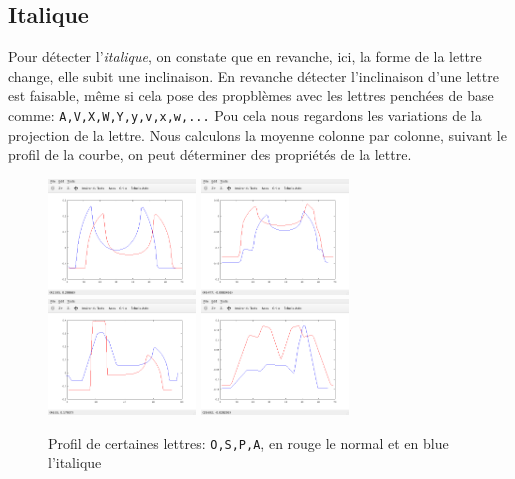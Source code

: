 \documentclass[a4paper,12pt,titlepage]{report}
\begin{document}
	\subsection{Italique}
	Pour détecter l'\textit{italique}, on constate que en revanche, ici, la forme de la lettre change, elle subit une inclinaison.
	En revanche détecter l'inclinaison d'une lettre est faisable, même si cela pose des propblèmes avec les lettres penchées de base comme: \texttt{A,V,X,W,Y,y,v,x,w,...}
	Pou cela nous regardons les variations de la projection de la lettre. Nous calculons la moyenne colonne par colonne, suivant le profil de la courbe, on peut déterminer des propriétés de la lettre.
	\begin{figure}[h]
	\centering
		\includegraphics[width=0.35\textwidth]{../illus/comp/projO.png}
		\includegraphics[width=0.35\textwidth]{../illus/comp/projS.png}\\
		\includegraphics[width=0.35\textwidth]{../illus/comp/projP.png}
		\includegraphics[width=0.35\textwidth]{../illus/comp/projA.png}
		\caption{Profil de certaines lettres: \texttt{O,S,P,A}, en rouge le normal et en blue l'italique}
	\end{figure}
\end{document}
